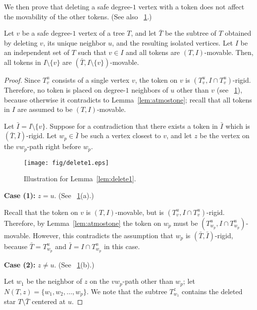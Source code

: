 \documentclass{llncs}
\newcommand{\Nei}[2]{N(#1,#2)}
\newcommand{\Tsub}[2]{T_{#1}^{#2}}
\newcommand{\bfI}{I}
\newcommand{\Tminus}{\bar{T}}
\newcommand{\Iminus}{\bar{I}}
\newcounter{one}
\begin{document}
	We then prove that deleting a safe degree-$1$ vertex with a token does not affect the movability of the other tokens. 
(See also \figurename~\ref{fig:delete1}.) 
	\begin{lemma} \label{lem:delete1}
	Let $v$ be a safe degree-$1$ vertex of a tree $T$, and let $\Tminus$ be the subtree of $T$ obtained by deleting $v$, its unique neighbor $u$, and the resulting isolated vertices.
	Let $\bfI$ be an independent set of $T$ such that $v \in \bfI$ and all tokens are $(T, \bfI)$-movable.
	Then, all tokens in $\bfI \setminus \{v\}$ are $(\Tminus, \bfI \setminus \{v\})$-movable.
	\end{lemma}
	\begin{proof}
	Since $\Tsub{v}{u}$ consists of a single vertex $v$, the token on $v$ is $(\Tsub{v}{u}, \bfI \cap \Tsub{v}{u})$-rigid. 
	Therefore, no token is placed on degree-$1$ neighbors of $u$ other than $v$ (see \figurename~\ref{fig:delete1}), because otherwise it contradicts to Lemma~\ref{lem:atmostone};
recall that all tokens in $\bfI$ are assumed to be $(T, \bfI)$-movable.


	Let $\Iminus = \bfI \setminus \{ v \}$. 
	Suppose for a contradiction that there exists a token in $\Iminus$ which is $(\Tminus, \Iminus)$-rigid.
	Let $w_p \in \Iminus$ be such a vertex closest to $v$, and let $z$ be the vertex on the $vw_p$-path right before $w_p$.
\smallskip

\begin{figure}[b]
\begin{center}
	\texttt{[image: fig/delete1.eps]}
	\end{center}
	\vspace{-1em}
	\caption{Illustration for Lemma~\ref{lem:delete1}.}
	\label{fig:delete1}
\end{figure}


\noindent
	{\bf Case (1):} $z = u$. (See \figurename~\ref{fig:delete1}(a).)

	Recall that the token on $v$ is $(T, \bfI)$-movable, but is $(\Tsub{v}{u}, \bfI \cap \Tsub{v}{u})$-rigid. 
	Therefore, by Lemma~\ref{lem:atmostone} the token on $w_p$ must be $(\Tsub{w_p}{u}, \bfI \cap \Tsub{w_p}{u})$-movable.
	However, this contradicts the assumption that $w_p$ is $(\Tminus, \Iminus)$-rigid, because $\Tminus = \Tsub{w_p}{u}$ and $\Iminus = \bfI \cap \Tsub{w_p}{u}$ in this case. 
\medskip

\noindent
	{\bf Case (2):} $z \neq u$. (See \figurename~\ref{fig:delete1}(b).)

	Let $w_1$ be the neighbor of $z$ on the $vw_p$-path other than $w_p$; 
let $\Nei{T}{z} = \{ w_1, w_2, \ldots, w_p\}$.
	We note that the subtree $\Tsub{w_1}{z}$ contains the deleted star $T \setminus \Tminus$ centered at $u$.


\end{proof}
\end{document}
